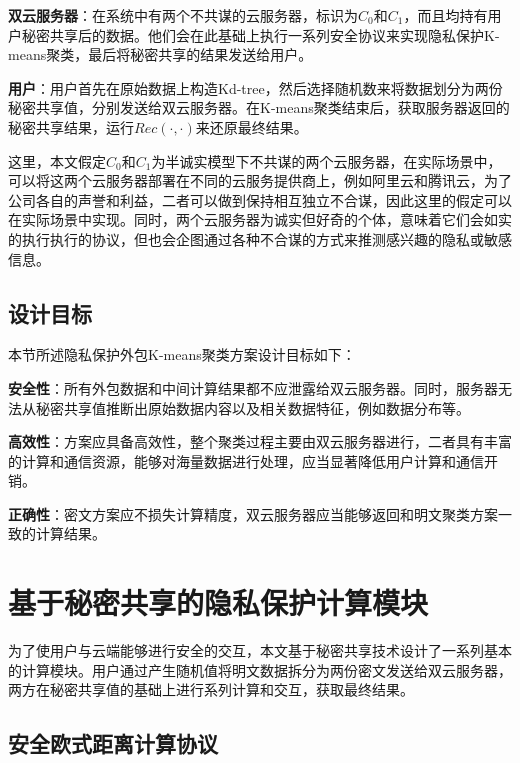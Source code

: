 \begin{compactitem}
	\item \textbf{双云服务器}：在系统中有两个不共谋的云服务器，标识为$ C_0 $和$ C_1 $，而且均持有用户秘密共享后的数据。他们会在此基础上执行一系列安全协议来实现隐私保护K-means聚类，最后将秘密共享的结果发送给用户。
	\item \textbf{用户}：用户首先在原始数据上构造Kd-tree，然后选择随机数来将数据划分为两份秘密共享值，分别发送给双云服务器。在K-means聚类结束后，获取服务器返回的秘密共享结果，运行$ Rec(\cdot,\cdot) $来还原最终结果。
\end{compactitem}

这里，本文假定$C_0$和$C_1$为半诚实模型下不共谋的两个云服务器，在实际场景中，可以将这两个云服务器部署在不同的云服务提供商上，例如阿里云和腾讯云，为了公司各自的声誉和利益，二者可以做到保持相互独立不合谋，因此这里的假定可以在实际场景中实现。同时，两个云服务器为诚实但好奇的个体，意味着它们会如实的执行执行的协议，但也会企图通过各种不合谋的方式来推测感兴趣的隐私或敏感信息。
\subsection{设计目标}
本节所述隐私保护外包K-means聚类方案设计目标如下：
\begin{compactitem}
	\item \textbf{安全性}：所有外包数据和中间计算结果都不应泄露给双云服务器。同时，服务器无法从秘密共享值推断出原始数据内容以及相关数据特征，例如数据分布等。
	\item \textbf{高效性}：方案应具备高效性，整个聚类过程主要由双云服务器进行，二者具有丰富的计算和通信资源，能够对海量数据进行处理，应当显著降低用户计算和通信开销。
	\item \textbf{正确性}：密文方案应不损失计算精度，双云服务器应当能够返回和明文聚类方案一致的计算结果。
\end{compactitem}
\section{基于秘密共享的隐私保护计算模块}
\label{s3-mokuai}
为了使用户与云端能够进行安全的交互，本文基于秘密共享技术设计了一系列基本的计算模块。用户通过产生随机值将明文数据拆分为两份密文发送给双云服务器，两方在秘密共享值的基础上进行系列计算和交互，获取最终结果。

\subsection{安全欧式距离计算协议}

